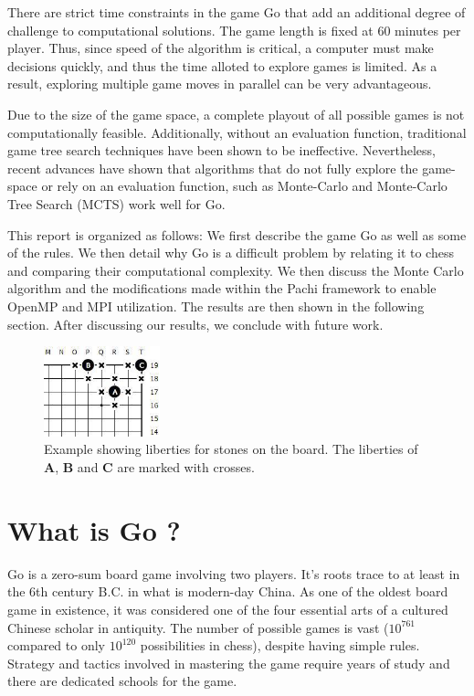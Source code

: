 \documentclass[nocopyrightspace, 10pt]{sigplanconf}
\begin{document}
There are strict time constraints in the game Go that add an additional degree of challenge to computational solutions. The game length is fixed at 60 minutes per player. Thus, since speed of the algorithm is critical, a computer must make decisions quickly, and thus the time alloted to explore games is limited. As a result, exploring multiple game moves in parallel can be very advantageous.

Due to the size of the game space, a complete playout of all possible games is not computationally feasible. Additionally, without an evaluation function, traditional game tree search techniques have been shown to be ineffective. Nevertheless, recent advances have shown that algorithms that do not fully explore the game-space or rely on an evaluation function, such as Monte-Carlo and Monte-Carlo Tree Search (MCTS) work well for Go. 

This report is organized as follows: We first describe the game Go as well as some of the rules. We then detail why Go is a difficult problem by relating it to chess and comparing their computational complexity. We then discuss the Monte Carlo algorithm and the modifications made within the Pachi framework to enable  OpenMP and MPI utilization. The results are then shown in the following section. After discussing our results, we conclude with future work.


\begin{figure}
\begin{center}
\includegraphics[width=0.3\textwidth]{liberties.jpg}
\end{center}
\caption{Example showing liberties for stones on the board. The liberties of \textbf{A}, \textbf{B} and \textbf{C} are marked with crosses.}
\label{liberties}
\end{figure}

\section{What is Go ?}

Go is a zero-sum board game involving two players. It's roots trace to at least in the 6th century B.C. in what is modern-day China. As one of the oldest board game in existence, it was considered one of the four essential arts of a cultured Chinese scholar in antiquity. The number of possible games is vast ($10^{761}$ compared to only $10^{120}$ possibilities in chess), despite having simple rules. Strategy and tactics involved in mastering the game require years of study and there are dedicated schools for the game.
\end{document}
